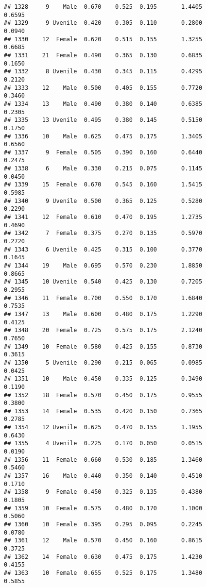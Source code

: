 \documentclass[
]{article}
\begin{document}
\begin{verbatim}
## 1328     9    Male  0.670    0.525  0.195       1.4405         0.6595
## 1329     9 Uvenile  0.420    0.305  0.110       0.2800         0.0940
## 1330    12  Female  0.620    0.515  0.155       1.3255         0.6685
## 1331    21  Female  0.490    0.365  0.130       0.6835         0.1650
## 1332     8 Uvenile  0.430    0.345  0.115       0.4295         0.2120
## 1333    12    Male  0.500    0.405  0.155       0.7720         0.3460
## 1334    13    Male  0.490    0.380  0.140       0.6385         0.2305
## 1335    13 Uvenile  0.495    0.380  0.145       0.5150         0.1750
## 1336    10    Male  0.625    0.475  0.175       1.3405         0.6560
## 1337     9  Female  0.505    0.390  0.160       0.6440         0.2475
## 1338     6    Male  0.330    0.215  0.075       0.1145         0.0450
## 1339    15  Female  0.670    0.545  0.160       1.5415         0.5985
## 1340     9 Uvenile  0.500    0.365  0.125       0.5280         0.2290
## 1341    12  Female  0.610    0.470  0.195       1.2735         0.4690
## 1342     7  Female  0.375    0.270  0.135       0.5970         0.2720
## 1343     6 Uvenile  0.425    0.315  0.100       0.3770         0.1645
## 1344    19    Male  0.695    0.570  0.230       1.8850         0.8665
## 1345    10 Uvenile  0.540    0.425  0.130       0.7205         0.2955
## 1346    11  Female  0.700    0.550  0.170       1.6840         0.7535
## 1347    13    Male  0.600    0.480  0.175       1.2290         0.4125
## 1348    20  Female  0.725    0.575  0.175       2.1240         0.7650
## 1349    10  Female  0.580    0.425  0.155       0.8730         0.3615
## 1350     5 Uvenile  0.290    0.215  0.065       0.0985         0.0425
## 1351    10    Male  0.450    0.335  0.125       0.3490         0.1190
## 1352    18  Female  0.570    0.450  0.175       0.9555         0.3800
## 1353    14  Female  0.535    0.420  0.150       0.7365         0.2785
## 1354    12 Uvenile  0.625    0.470  0.155       1.1955         0.6430
## 1355     4 Uvenile  0.225    0.170  0.050       0.0515         0.0190
## 1356    11  Female  0.660    0.530  0.185       1.3460         0.5460
## 1357    16    Male  0.440    0.350  0.140       0.4510         0.1710
## 1358     9  Female  0.450    0.325  0.135       0.4380         0.1805
## 1359    10  Female  0.575    0.480  0.170       1.1000         0.5060
## 1360    10  Female  0.395    0.295  0.095       0.2245         0.0780
## 1361    12    Male  0.570    0.450  0.160       0.8615         0.3725
## 1362    14  Female  0.630    0.475  0.175       1.4230         0.4155
## 1363    10  Female  0.655    0.525  0.175       1.3480         0.5855

\end{verbatim}
\end{document}
